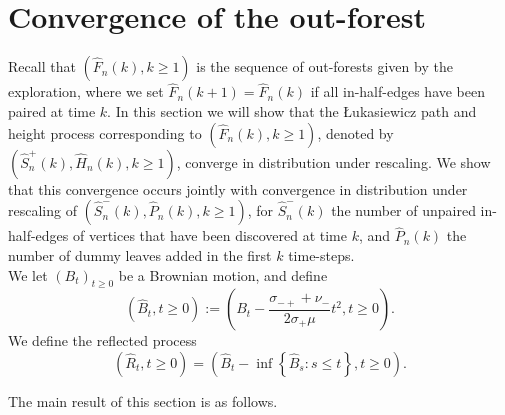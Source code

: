 \section{Convergence of the out-forest}\label{sec.convoutforest}

Recall that $(\hat{F}_n(k),k\geq 1)$ is the sequence of out-forests given by the exploration, where we set $\hat{F}_n(k+1)=\hat{F}_n(k)$ if all in-half-edges have been paired at time $k$. In this section we will show that the \L ukasiewicz path and height process corresponding to $(\hat{F}_n(k),k\geq 1)$, denoted by $(\hat{S}^{+}_n(k),\hat{H}_n(k),k\geq 1)$, converge in distribution under rescaling. We show that this convergence occurs jointly with convergence in distribution under rescaling of $(\hat{S}^-_n(k),\hat{P}_n(k), k\geq 1)$, for $\hat{S}^-_n(k)$ the number of unpaired in-half-edges of vertices that have been discovered at time $k$, and $\hat{P}_n(k)$ the number of dummy leaves added in the first $k$ time-steps.  \\
We let $(B_t)_{t\geq 0}$ be a Brownian motion, and define
$$(\hat{B}_t,t\geq 0):=\left( B_t-\frac{\sigma_{-+}+\nu_-}{2\sigma_+ \mu}t^2, t\geq 0\right).$$ 
We define the reflected process $$(\hat{R}_t,t\geq 0)= \left(\hat{B}_t-\inf\left\{\hat{B}_s: s\leq t\right\},t\geq 0\right).$$

The main result of this section is as follows. 

